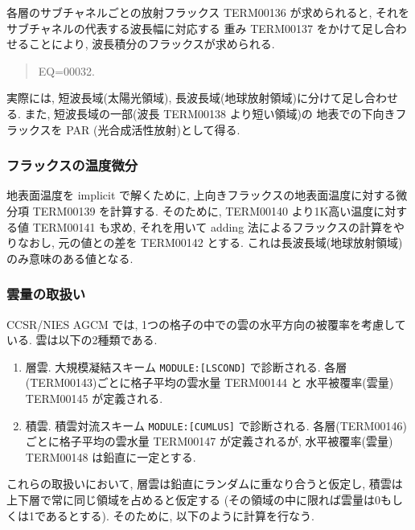 各層のサブチャネルごとの放射フラックス TERM00136 が求められると,
それをサブチャネルの代表する波長幅に対応する
重み TERM00137 をかけて足し合わせることにより,
波長積分のフラックスが求められる.

\begin{quote}
EQ=00032.
\end{quote}

実際には, 短波長域(太陽光領域), 
長波長域(地球放射領域)に分けて足し合わせる.
また, 短波長域の一部(波長 TERM00138 より短い領域)の
地表での下向きフラックスを PAR (光合成活性放射)として得る.

\subsubsection{フラックスの温度微分}

地表面温度を implicit で解くために,
上向きフラックスの地表面温度に対する微分項
TERM00139 を計算する.
そのために, TERM00140 より1K高い温度に対する値 
TERM00141 も求め, それを用いて
adding 法によるフラックスの計算をやりなおし,
元の値との差を TERM00142 とする.
これは長波長域(地球放射領域)のみ意味のある値となる.

\subsubsection{雲量の取扱い}

CCSR/NIES AGCM では,
1つの格子の中での雲の水平方向の被覆率を考慮している.
雲は以下の2種類である.
\begin{enumerate}
\item 層雲. 大規模凝結スキーム \texttt{MODULE:[LSCOND]} で診断される.
      各層(TERM00143)ごとに格子平均の雲水量 TERM00144 と
      水平被覆率(雲量) TERM00145 が定義される.      
\item 積雲. 積雲対流スキーム \texttt{MODULE:[CUMLUS]} で診断される.
      各層(TERM00146)ごとに格子平均の雲水量 TERM00147 が定義されるが,
      水平被覆率(雲量) TERM00148 は鉛直に一定とする.
\end{enumerate}
これらの取扱いにおいて, 層雲は鉛直にランダムに重なり合うと仮定し,
積雲は上下層で常に同じ領域を占めると仮定する
(その領域の中に限れば雲量は0もしくは1であるとする).
そのために, 以下のように計算を行なう.

